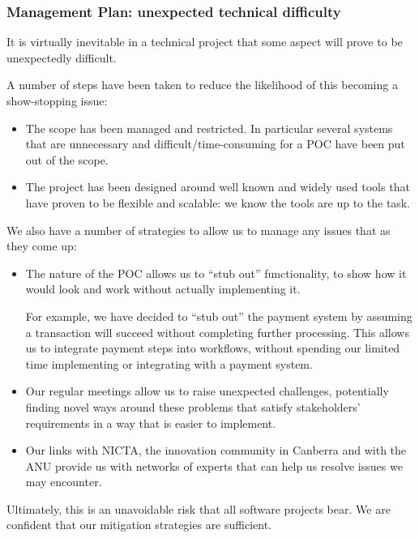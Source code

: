 \documentclass[12pt,a4paper,twosided]{article}
\begin{document}
\subsubsection{Management Plan: unexpected technical difficulty}

It is virtually inevitable in a technical project that some aspect will
prove to be unexpectedly difficult.

A number of steps have been taken to reduce the likelihood of this
becoming a show-stopping issue:

\begin{itemize}
\itemsep1pt\parskip0pt
\item
  The scope has been managed and restricted. In particular several
  systems that are unnecessary and difficult/time-consuming for a POC
  have been put out of the scope.
\item
  The project has been designed around well known and widely used tools
  that have proven to be flexible and scalable: we know the tools are up
  to the task.
\end{itemize}

We also have a number of strategies to allow us to manage any issues
that as they come up:

\begin{itemize}
\item
  The nature of the POC allows us to ``stub out'' functionality, to show
  how it would look and work without actually implementing it.

  For example, we have decided to ``stub out'' the payment system by
  assuming a transaction will succeed without completing further
  processing. This allows us to integrate payment steps into workflows,
  without spending our limited time implementing or integrating with a
  payment system.
\item
  Our regular meetings allow us to raise unexpected challenges,
  potentially finding novel ways around these problems that satisfy
  stakeholders' requirements in a way that is easier to implement.
\item
  Our links with NICTA, the innovation community in Canberra and with
  the ANU provide us with networks of experts that can help us resolve
  issues we may encounter.
\end{itemize}

Ultimately, this is an unavoidable risk that all software projects bear.
We are confident that our mitigation strategies are sufficient.
\end{document}
